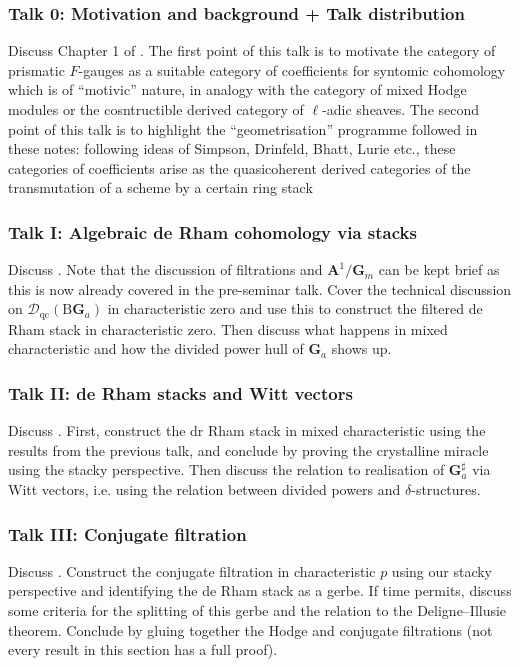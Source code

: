 \documentclass{article}
\begin{document}
\subsubsection*{Talk 0: Motivation and background + Talk distribution}
Discuss Chapter 1 of \cite{bhatt2022prismatic}. The first point of this talk is to motivate the category of prismatic $F$-gauges as a suitable category of coefficients for syntomic cohomology which is of \enquote{motivic} nature, in analogy with the category of mixed Hodge modules or the cosntructible derived category of $\ell$-adic sheaves. The second point of this talk is to highlight the \enquote{geometrisation} programme followed in these notes: following ideas of Simpson, Drinfeld, Bhatt, Lurie etc., these categories of coefficients arise as the quasicoherent derived categories of the transmutation of a scheme by a certain ring stack

\subsubsection*{Talk I: Algebraic de Rham cohomology via stacks }
Discuss \cite[Section 2.2-2.4]{bhatt2022prismatic}. Note that the discussion of filtrations and $\mathbf{A}^1/\mathbf{G}_m$ can be kept brief as this is now already covered in the pre-seminar talk. Cover the technical discussion on $\mathscr{D}_\mathrm{qc}(\mathrm{B}\mathbf{G}_a)$
 in characteristic zero and use this to construct the filtered de Rham stack in characteristic zero. Then discuss what happens in mixed characteristic and how the divided power hull of $\mathbf{G}_a$ shows up.
\subsubsection*{Talk II: de Rham stacks and Witt vectors}
Discuss \cite[Section 2.5-2.6]{bhatt2022prismatic}. First, construct the dr Rham stack in mixed characteristic using the results from the previous talk, and conclude by proving the crystalline miracle using the stacky perspective. Then discuss the relation to realisation of $\mathbf{G}_a^\sharp$ via Witt vectors, i.e. using the relation between divided powers and $\delta$-structures.
\subsubsection*{Talk III: Conjugate filtration}
Discuss \cite[Section 2.7-2.8]{bhatt2022prismatic}. Construct the conjugate filtration in characteristic $p$ using our stacky perspective and identifying the de Rham stack as a gerbe. If time permits, discuss some criteria for the splitting of this gerbe and the relation to the Deligne--Illusie theorem. Conclude by gluing together the Hodge and conjugate filtrations (not every result in this section has a full proof).
\end{document}
